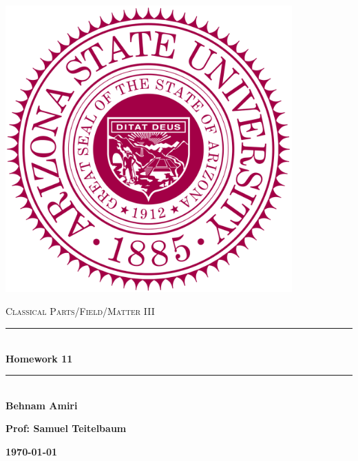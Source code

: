\documentclass[fleqn]{article}
\begin{document}
  \begin{titlepage}

    \newcommand{\HRule}{\rule{\linewidth}{0.5mm}}

    \center

    \begin{center}
      \includegraphics[height=11cm, width=11cm]{asu.png}
    \end{center}

    \vline

    \textsc{\LARGE Classical Parts/Field/Matter III}\\[1.5cm]

    \HRule \\[0.5cm]
    { \huge \bfseries Homework 11}\\[0.4cm] 
    \HRule \\[1.0cm]

    \textbf{Behnam Amiri}

    \bigbreak

    \textbf{Prof: Samuel Teitelbaum}

    \bigbreak

    \textbf{{\large \today}\\[2cm]}

    \vfill

  \end{titlepage}
\end{document}
